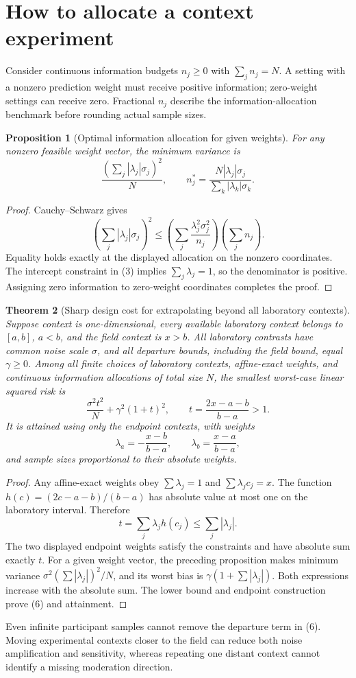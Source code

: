 \documentclass[11pt,a4paper]{article}
\newtheorem{theorem}{Theorem}[section]
\newtheorem{proposition}[theorem]{Proposition}
\theoremstyle{remark}
\begin{document}
\section{How to allocate a context experiment}
Consider continuous information budgets $n_j\ge0$ with $\sum_jn_j=N$. A setting with a nonzero prediction weight must receive positive information; zero-weight settings can receive zero. Fractional $n_j$ describe the information-allocation benchmark before rounding actual sample sizes.

\begin{proposition}[Optimal information allocation for given weights]
For any nonzero feasible weight vector, the minimum variance is
\[
 \frac{\left(\sum_j|\lambda_j|\sigma_j\right)^2}{N},
 \qquad
 n_j^*=\frac{N|\lambda_j|\sigma_j}{\sum_k|\lambda_k|\sigma_k}.
\]
\end{proposition}
\begin{proof}
Cauchy--Schwarz gives
\[
 \left(\sum_j|\lambda_j|\sigma_j\right)^2
 \le\left(\sum_j\frac{\lambda_j^2\sigma_j^2}{n_j}\right)
       \left(\sum_jn_j\right).
\]
Equality holds exactly at the displayed allocation on the nonzero coordinates. The intercept constraint in (3) implies $\sum_j\lambda_j=1$, so the denominator is positive. Assigning zero information to zero-weight coordinates completes the proof.
\end{proof}

\begin{theorem}[Sharp design cost for extrapolating beyond all laboratory contexts]
Suppose context is one-dimensional, every available laboratory context belongs to $[a,b]$, $a<b$, and the field context is $x>b$. All laboratory contrasts have common noise scale $\sigma$, and all departure bounds, including the field bound, equal $\gamma\ge0$. Among all finite choices of laboratory contexts, affine-exact weights, and continuous information allocations of total size $N$, the smallest worst-case linear squared risk is
\[
 \frac{\sigma^2 t^2}{N}+\gamma^2(1+t)^2,
 \qquad t=\frac{2x-a-b}{b-a}>1. \tag{6}
\]
It is attained using only the endpoint contexts, with weights
\[
 \lambda_a=-\frac{x-b}{b-a},\qquad
 \lambda_b=\frac{x-a}{b-a},
\]
and sample sizes proportional to their absolute weights.
\end{theorem}
\begin{proof}
Any affine-exact weights obey $\sum\lambda_j=1$ and $\sum\lambda_jc_j=x$. The function $h(c)=(2c-a-b)/(b-a)$ has absolute value at most one on the laboratory interval. Therefore
\[
 t=\sum_j\lambda_jh(c_j)\le\sum_j|\lambda_j|.
\]
The two displayed endpoint weights satisfy the constraints and have absolute sum exactly $t$. For a given weight vector, the preceding proposition makes minimum variance $\sigma^2(\sum|\lambda_j|)^2/N$, and its worst bias is $\gamma(1+\sum|\lambda_j|)$. Both expressions increase with the absolute sum. The lower bound and endpoint construction prove (6) and attainment.
\end{proof}
Even infinite participant samples cannot remove the departure term in (6). Moving experimental contexts closer to the field can reduce both noise amplification and sensitivity, whereas repeating one distant context cannot identify a missing moderation direction.
\end{document}
